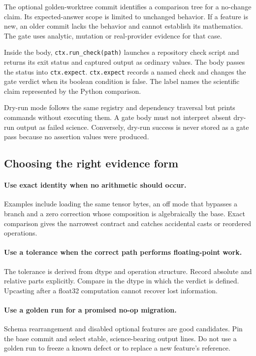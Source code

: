 \documentclass[10pt,aps,prd,twocolumn,nofootinbib]{revtex4-2}
\newcommand{\code}[1]{\texttt{#1}}
\begin{document}
The optional golden-worktree commit identifies a comparison tree for a
no-change claim.  Its expected-answer scope is limited to unchanged behavior.
If a feature is new, an older commit lacks the behavior and cannot establish its mathematics.
The gate uses analytic, mutation or real-provider evidence for that case.

Inside the body, \code{ctx.run\_check(path)} launches a repository check script
and returns its exit status and captured output as ordinary values.  The body
passes the status into \code{ctx.expect}.
\code{ctx.expect} records a named check and changes the gate verdict when its
boolean condition is false.  The label names the scientific claim represented
by the Python comparison.

Dry-run mode follows the same registry and dependency traversal but prints
commands without executing them.  A gate body must not interpret absent
dry-run output as failed science.  Conversely, dry-run success is never stored
as a gate pass because no assertion values were produced.

\subsection{Choosing the right evidence form}

\paragraph{Use exact identity when no arithmetic should occur.}
Examples include loading the same tensor bytes, an off mode that bypasses a
branch and a zero correction whose composition is algebraically the base.
Exact comparison gives the narrowest contract and catches accidental
casts or reordered operations.

\paragraph{Use a tolerance when the correct path performs floating-point work.}
The tolerance is derived from dtype and operation structure.  Record absolute
and relative parts explicitly.  Compare in the dtype in which the verdict is
defined.  Upcasting after a float32 computation cannot recover lost
information.

\paragraph{Use a golden run for a promised no-op migration.}
Schema rearrangement and disabled optional features are good candidates.  Pin
the base commit and select stable, science-bearing output lines.  Do not use a
golden run to freeze a known defect or to replace a new feature's reference.
\end{document}
